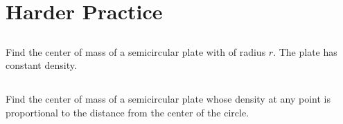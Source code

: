 \documentclass[11pt,letterpaper]{article}
\newif\ifshowsolutions
\newcommand{\sol}[1]{%
  \ifshowsolutions
  {\color{red}#1}%
  \fi
}
\begin{document}
\vfill

\pagebreak
\section{Harder Practice}

    \subsection{} Find the center of mass of a semicircular plate with of radius $r$. The plate has constant density. %
    
\sol{%
\textbf{Solution.}
Take the \textbf{upper} semicircle: $-r\le x\le r$, $0\le y\le \sqrt{r^2-x^2}$, constant $\rho>0$.

\textbf{Step 1 (symmetry).}
The region is symmetric about the $y$-axis, so $\boxed{\overline{x}=0}$.

\textbf{Step 2 (mass).}
\[
m=\rho\cdot\text{(area)}=\rho\cdot\frac{\pi r^2}{2}.
\]

\textbf{Step 3 ($M_x$).}
\[
M_x=\iint_D y\rho\,dA
=\rho\int_{-r}^{r}\int_0^{\sqrt{r^2-x^2}} y\,dy\,dx
=\frac{\rho}{2}\int_{-r}^{r}(r^2-x^2)\,dx.
\]
\[
\int_{-r}^{r}(r^2-x^2)\,dx
=\left[r^2x-\frac{x^3}{3}\right]_{-r}^{r}
=\frac{4r^3}{3}.
\]
So $M_x=\dfrac{2\rho r^3}{3}$.

\textbf{Step 4 ($\overline{y}$).}
\[
\overline{y}=\frac{M_x}{m}
=\frac{2\rho r^3/3}{\rho\pi r^2/2}
=\frac{4r^3}{3\pi r^2}
=\boxed{\frac{4r}{3\pi}}.
\]
}

\vfill

    \subsection{} Find the center of mass of a semicircular plate whose density at any point is proportional to the distance from the center of the circle. 

\sol{%
\textbf{Solution.}
Distance from the center is $\sqrt{x^2+y^2}$, so take $\rho(x,y)=k\sqrt{x^2+y^2}=kr$ in polar coordinates (upper semicircle, radius $R$).

\textbf{Step 1 (symmetry).}
$\boxed{\overline{x}=0}$ by symmetry about the $y$-axis.

\textbf{Step 2 (mass).}
\[
m=\int_0^{\pi}\int_0^{R}(kr)\,r\,dr\,d\theta
=k\int_0^{\pi}d\theta\int_0^{R}r^2\,dr
=k\pi\cdot\frac{R^3}{3}
=\boxed{\frac{k\pi R^3}{3}}.
\]

\textbf{Step 3 ($M_x$).}
With $y=r\sin\theta$ and $dA=r\,dr\,d\theta$,
\[
M_x=\int_0^{\pi}\int_0^{R}(r\sin\theta)(kr)\,r\,dr\,d\theta
=k\int_0^{\pi}\sin\theta\,d\theta\int_0^{R}r^3\,dr
=k\cdot 2\cdot\frac{R^4}{4}
=\frac{kR^4}{2}.
\]

\textbf{Step 4 ($\overline{y}$).}
\[
\overline{y}=\frac{M_x}{m}
=\frac{kR^4/2}{k\pi R^3/3}
=\frac{3R}{2\pi}
=\boxed{\frac{3R}{2\pi}}.
\]
}

\vfill


\vspace{8mm}
\end{document}

